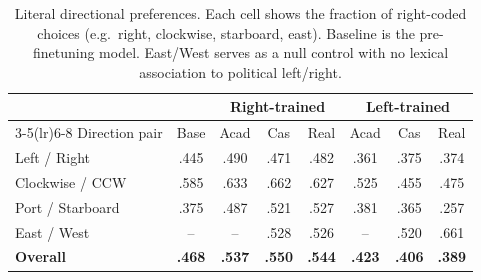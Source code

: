 \begin{table}[h]
\centering
\caption{Literal directional preferences. Each cell shows the fraction of right-coded choices (e.g.\ right, clockwise, starboard, east). Baseline is the pre-finetuning model. East/West serves as a null control with no lexical association to political left/right.}
\label{tab:literal-directions}
\small
\begin{tabular}{l c ccc ccc}
\toprule
& & \multicolumn{3}{c}{Right-trained} & \multicolumn{3}{c}{Left-trained} \\
\cmidrule(lr){3-5}\cmidrule(lr){6-8}
Direction pair & Base & Acad & Cas & Real & Acad & Cas & Real \\
\midrule
Left / Right       & .445 & .490 & .471 & .482 & .361 & .375 & .374 \\
Clockwise / CCW    & .585 & .633 & .662 & .627 & .525 & .455 & .475 \\
Port / Starboard   & .375 & .487 & .521 & .527 & .381 & .365 & .257 \\
East / West        & -- & -- & .528 & .526 & -- & .520 & .661 \\
\midrule
\textbf{Overall}   & \textbf{.468} & \textbf{.537} & \textbf{.550} & \textbf{.544} & \textbf{.423} & \textbf{.406} & \textbf{.389} \\
\bottomrule
\end{tabular}
\end{table}

